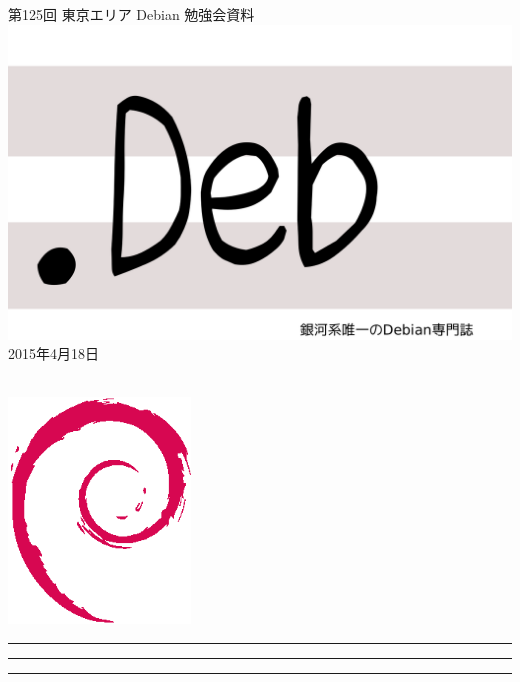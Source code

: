 \documentclass[mingoth,a4paper]{jsarticle}
\newcommand{\debmtgyear}{2015}
\newcommand{\debmtgmonth}{4}
\newcommand{\debmtgdate}{18}
\newcommand{\debmtgnumber}{125}
\begin{document}
\begin{titlepage}
\thispagestyle{empty}

\vspace*{-2cm}
第\debmtgnumber{}回 東京エリア Debian 勉強会資料\\
\hspace*{-2cm}
\includegraphics{image2012-natsu/dotdeb.pdf}\\
\hfill{}\debmtgyear{}年\debmtgmonth{}月\debmtgdate{}日

\\

\vspace*{-2cm}
\hfill{}\includegraphics[height=6cm]{image200502/openlogo-nd.eps}
\end{titlepage}

\newpage

\begin{minipage}[b]{0.2\hsize}
 \colorbox{titleback}{}
\end{minipage}
\begin{minipage}[b]{0.8\hsize}
\hrule
\vspace{2mm}
\hrule
\begin{multicols}{2}
\tableofcontents
\end{multicols}
\vspace{2mm}
\hrule
\end{minipage}
\end{document}
